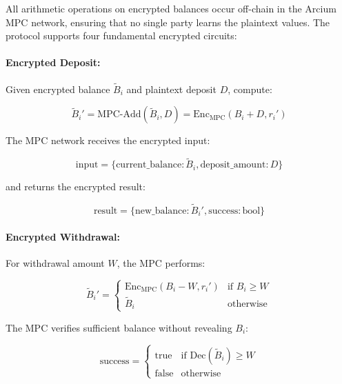 \documentclass[11pt,a4paper]{article}
\begin{document}
All arithmetic operations on encrypted balances occur off-chain in the Arcium MPC network, ensuring that no single party learns the plaintext values. The protocol supports four fundamental encrypted circuits:

\paragraph{Encrypted Deposit:} Given encrypted balance $\widetilde{B}_i$ and plaintext deposit $D$, compute:

\begin{equation}
\widetilde{B}_i' = \text{MPC-Add}(\widetilde{B}_i, D) = \text{Enc}_{\text{MPC}}(B_i + D, r_i')
\end{equation}

The MPC network receives the encrypted input:

\begin{equation}
\text{input} = \{\text{current\_balance}: \widetilde{B}_i, \text{deposit\_amount}: D\}
\end{equation}

and returns the encrypted result:

\begin{equation}
\text{result} = \{\text{new\_balance}: \widetilde{B}_i', \text{success}: \text{bool}\}
\end{equation}

\paragraph{Encrypted Withdrawal:} For withdrawal amount $W$, the MPC performs:

\begin{equation}
\widetilde{B}_i' = \begin{cases}
\text{Enc}_{\text{MPC}}(B_i - W, r_i') & \text{if } B_i \geq W \\
\widetilde{B}_i & \text{otherwise}
\end{cases}
\end{equation}

The MPC verifies sufficient balance without revealing $B_i$:

\begin{equation}
\text{success} = \begin{cases}
\text{true} & \text{if } \text{Dec}(\widetilde{B}_i) \geq W \\
\text{false} & \text{otherwise}
\end{cases}
\end{equation}
\end{document}

